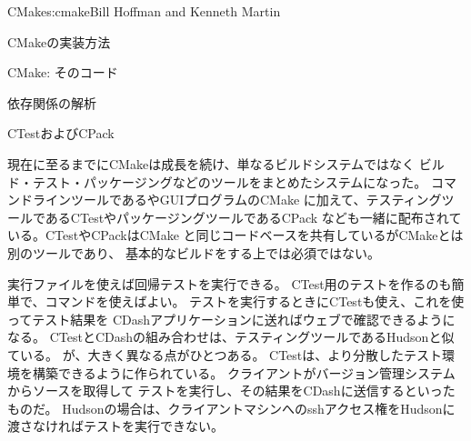 \begin{aosachapter}{CMake}{s:cmake}{Bill Hoffman and Kenneth Martin}
\begin{aosasect1}{CMakeの実装方法}
\begin{aosasect2}{CMake: そのコード}
\begin{aosasect3}{依存関係の解析}
\end{aosasect3}

\begin{aosasect3}{CTestおよびCPack}

現在に至るまでにCMakeは成長を続け、単なるビルドシステムではなく
ビルド・テスト・パッケージングなどのツールをまとめたシステムになった。
コマンドラインツールであるやGUIプログラムのCMake
に加えて、テスティングツールであるCTestやパッケージングツールであるCPack
なども一緒に配布されている。CTestやCPackはCMake
と同じコードベースを共有しているがCMakeとは別のツールであり、
基本的なビルドをする上では必須ではない。

実行ファイルを使えば回帰テストを実行できる。
CTest用のテストを作るのも簡単で、コマンドを使えばよい。
テストを実行するときにCTestも使え、これを使ってテスト結果を
CDashアプリケーションに送ればウェブで確認できるようになる。
CTestとCDashの組み合わせは、テスティングツールであるHudsonと似ている。
が、大きく異なる点がひとつある。
CTestは、より分散したテスト環境を構築できるように作られている。
クライアントがバージョン管理システムからソースを取得して
テストを実行し、その結果をCDashに送信するといったものだ。
Hudsonの場合は、クライアントマシンへのsshアクセス権をHudsonに
渡さなければテストを実行できない。


\end{aosasect3}
\end{aosasect2}
\end{aosasect1}
\end{aosachapter}
